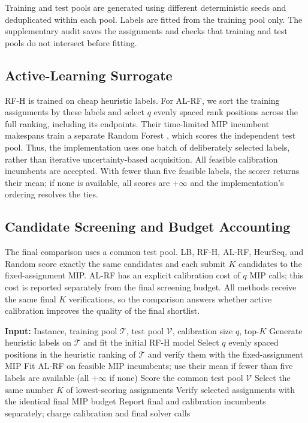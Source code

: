 \documentclass[conference]{IEEEtran}
\begin{document}
Training and test pools are generated using different deterministic seeds and deduplicated within each pool. Labels are fitted from the training pool only. The supplementary audit saves the assignments and checks that training and test pools do not intersect before fitting.

\subsection{Active-Learning Surrogate}
RF-H is trained on cheap heuristic labels. For AL-RF, we sort the training assignments by these labels and select $q$ evenly spaced rank positions across the full ranking, including its endpoints. Their time-limited MIP incumbent makespans train a separate Random Forest \cite{Breiman2001}, which scores the independent test pool. Thus, the implementation uses one batch of deliberately selected labels, rather than iterative uncertainty-based acquisition. All feasible calibration incumbents are accepted. With fewer than five feasible labels, the scorer returns their mean; if none is available, all scores are $+\infty$ and the implementation's ordering resolves the ties.

\subsection{Candidate Screening and Budget Accounting}
The final comparison uses a common test pool. LB, RF-H, AL-RF, HeurSeq, and Random score exactly the same candidates and each submit $K$ candidates to the fixed-assignment MIP. AL-RF has an explicit calibration cost of $q$ MIP calls; this cost is reported separately from the final screening budget. All methods receive the same final $K$ verifications, so the comparison answers whether active calibration improves the quality of the final shortlist.

\begin{algorithm}[htbp]\caption{Active-Learning Candidate Screening}\label{alg:beam}
\begin{algorithmic}[1]
\State \textbf{Input:} Instance, training pool $\mathcal{T}$, test pool $\mathcal{V}$, calibration size $q$, top-$K$
\State Generate heuristic labels on $\mathcal{T}$ and fit the initial RF-H model
\State Select $q$ evenly spaced positions in the heuristic ranking of $\mathcal{T}$ and verify them with the fixed-assignment MIP
\State Fit AL-RF on feasible MIP incumbents; use their mean if fewer than five labels are available (all $+\infty$ if none)
    \State Score the common test pool $\mathcal{V}$
    \State Select the same number $K$ of lowest-scoring assignments
    \State Verify selected assignments with the identical final MIP budget
\EndFor
\State Report final and calibration incumbents separately; charge calibration and final solver calls
\end{algorithmic}
\end{algorithm}
\end{document}
